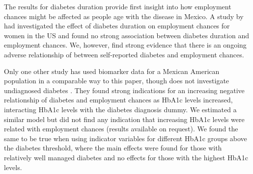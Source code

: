 The results for diabetes duration provide first insight into how employment
chances might be affected as people age with the disease in Mexico.
A study by \citet{Minor2013} had investigated the effect of diabetes
duration on employment chances for women in the US and found no strong
association between diabetes duration and employment chances. We,
however, find strong evidence that there is an ongoing adverse relationship
of between self-reported diabetes and employment chances. 

Only one other study has used biomarker data for a Mexican American
population in a comparable way to this paper, though does not investigate
undiagnosed diabetes \citep{BrownIII2011}. They found strong indications
for an increasing negative relationship of diabetes and employment
chances as \ac{HbA1c} levels increased, interacting \ac{HbA1c} levels
with the diabetes diagnosis dummy. We estimated a similar model but
did not find any indication that increasing \ac{HbA1c} levels were
related with employment chances (results available on request). We
found the same to be true when using indicator variables for different
\ac{HbA1c} groups above the diabetes threshold, where the main effects
were found for those with relatively well managed diabetes and no
effects for those with the highest \ac{HbA1c} levels.

